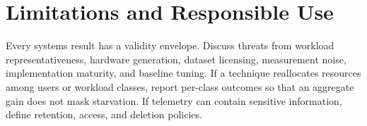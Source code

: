 \section{Limitations and Responsible Use}

Every systems result has a validity envelope.  Discuss threats from workload
representativeness, hardware generation, dataset licensing, measurement noise,
implementation maturity, and baseline tuning.  If a technique reallocates
resources among users or workload classes, report per-class outcomes so that an
aggregate gain does not mask starvation.  If telemetry can contain sensitive
information, define retention, access, and deletion policies.
